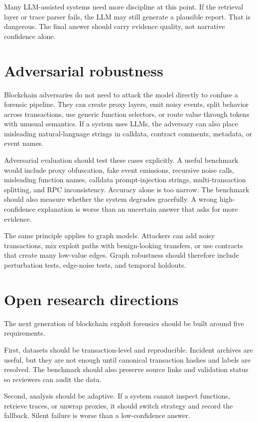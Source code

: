 \documentclass[conference]{IEEEtran}
\begin{document}
Many LLM-assisted systems need more discipline at this point. If the retrieval layer or trace parser fails, the LLM may still generate a plausible report. That is dangerous. The final answer should carry evidence quality, not narrative confidence alone.

\section{Adversarial robustness}

Blockchain adversaries do not need to attack the model directly to confuse a forensic pipeline. They can create proxy layers, emit noisy events, split behavior across transactions, use generic function selectors, or route value through tokens with unusual semantics. If a system uses LLMs, the adversary can also place misleading natural-language strings in calldata, contract comments, metadata, or event names.

Adversarial evaluation should test these cases explicitly. A useful benchmark would include proxy obfuscation, fake event emissions, recursive noise calls, misleading function names, calldata prompt-injection strings, multi-transaction splitting, and RPC inconsistency. Accuracy alone is too narrow. The benchmark should also measure whether the system degrades gracefully. A wrong high-confidence explanation is worse than an uncertain answer that asks for more evidence.

The same principle applies to graph models. Attackers can add noisy transactions, mix exploit paths with benign-looking transfers, or use contracts that create many low-value edges. Graph robustness should therefore include perturbation tests, edge-noise tests, and temporal holdouts.

\section{Open research directions}

The next generation of blockchain exploit forensics should be built around five requirements.

First, datasets should be transaction-level and reproducible. Incident archives are useful, but they are not enough until canonical transaction hashes and labels are resolved. The benchmark should also preserve source links and validation status so reviewers can audit the data.

Second, analysis should be adaptive. If a system cannot inspect functions, retrieve traces, or unwrap proxies, it should switch strategy and record the fallback. Silent failure is worse than a low-confidence answer.
\end{document}
